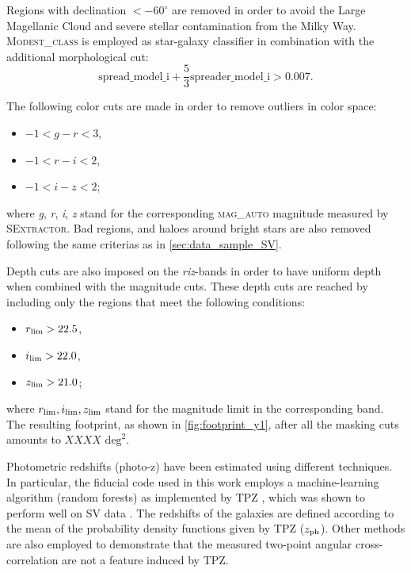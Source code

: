 Regions with declination $ < -60^{\circ}$ are removed in order to avoid the Large Magellanic Cloud and severe stellar contamination from the Milky Way. {\scshape Modest\_class} is employed as star-galaxy classifier in combination with the additional morphological cut:
\begin{equation}
\mbox{spread\_model\_i} + \frac{5}{3}\mbox{spreader\_model\_i} > 0.007.
\end{equation}
\newline

The following color cuts are made in order to remove outliers in color space:
\begin{itemize}
	\item $-1 < g-r < 3$,
	\item $-1 < r-i < 2$,
	\item $-1 < i-z < 2$;
\end{itemize}
where {\it g}, {\it r}, {\it i}, {\it z} stand for the corresponding {\scshape mag\_auto} magnitude measured by {\scshape SExtractor}. Bad regions, and haloes around bright stars are also removed following the same criterias as in \autoref{sec:data_sample_SV}.
\newline

Depth cuts are also imposed on the {\it riz}-bands in order to have uniform depth when combined with the magnitude cuts. These depth cuts are reached by including only the regions that meet the following conditions:
\begin{itemize}
	\item $r_{\rm lim} > 22.5$,
	\item $i_{\rm lim} > 22.0$,
	\item $z_{\rm lim} > 21.0$;
\end{itemize}
where $r_{\rm lim}, i_{\rm lim},z_{\rm lim}$ stand for the magnitude limit in the corresponding band. The resulting footprint, as shown in \autoref{fig:footprint_y1}, after all the masking cuts amounts to $XXXX \mbox{ deg}^2$.
\newline

Photometric redshifts (photo-z) have been estimated using different techniques. In particular, the fiducial code used in this work employs a machine-learning algorithm (random forests) as implemented by TPZ \cite{2013MNRAS.432.1483C}, which was shown to perform well on SV data \cite{2014MNRAS.445.1482S}. The redshifts of the galaxies are defined according to the mean of the probability density functions given by TPZ ($z_{\rm ph}$). Other methods are also employed to demonstrate that the measured two-point angular cross-correlation are not a feature induced by TPZ.
\newline

